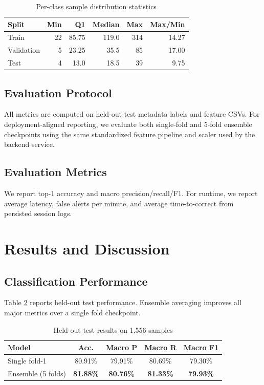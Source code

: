 \documentclass[conference]{IEEEtran}
\begin{document}
\begin{table}[t]
\caption{Per-class sample distribution statistics}
\label{tab:imbalance}
\centering
\begin{tabular}{lrrrrr}
\toprule
Split & Min & Q1 & Median & Max & Max/Min \\
\midrule
Train & 22 & 85.75 & 119.0 & 314 & 14.27 \\
Validation & 5 & 23.25 & 35.5 & 85 & 17.00 \\
Test & 4 & 13.0 & 18.5 & 39 & 9.75 \\
\bottomrule
\end{tabular}
\end{table}

\subsection{Evaluation Protocol}
All metrics are computed on held-out test metadata labels and feature CSVs. For deployment-aligned reporting, we evaluate both single-fold and 5-fold ensemble checkpoints using the same standardized feature pipeline and scaler used by the backend service.

\subsection{Evaluation Metrics}
We report top-1 accuracy and macro precision/recall/F1. For runtime, we report average latency, false alerts per minute, and average time-to-correct from persisted session logs.

\section{Results and Discussion}
\subsection{Classification Performance}
Table \ref{tab:class_results} reports held-out test performance. Ensemble averaging improves all major metrics over a single fold checkpoint.

\begin{table}[t]
\caption{Held-out test results on 1{,}556 samples}
\label{tab:class_results}
\centering
\begin{tabular}{lcccc}
\toprule
Model & Acc. & Macro P & Macro R & Macro F1 \\
\midrule
Single fold-1 & 80.91\% & 79.91\% & 80.69\% & 79.30\% \\
Ensemble (5 folds) & \textbf{81.88\%} & \textbf{80.76\%} & \textbf{81.33\%} & \textbf{79.93\%} \\
\bottomrule
\end{tabular}
\end{table}
\end{document}

